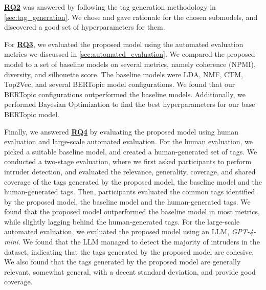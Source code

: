\hyperref[rq2]{\textbf{RQ2}} was answered by following the tag generation methodology in \cref{sec:tag_generation}. We chose and gave rationale for the chosen submodels, and discovered a good set of hyperparameters for them.

For \hyperref[rq3]{\textbf{RQ3}}, we evaluated the proposed model using the automated evaluation metrics we discussed in \cref{sec:automated_evaluation}. We compared the proposed model to a set of baseline models on several metrics, namely coherence (NPMI), diversity, and silhouette score. The baseline models were LDA, NMF, CTM, Top2Vec, and several BERTopic model configurations. We found that our BERTopic configurations outperformed the baseline models. Additionally, we performed Bayesian Optimization to find the best hyperparameters for our base BERTopic model.

Finally, we answered \hyperref[rq4]{\textbf{RQ4}} by evaluating the proposed model using human evaluation and large-scale automated evaluation. For the human evaluation,  we picked a suitable baseline model, and created a human-generated set of tags. We conducted a two-stage evaluation, where we first asked participants to perform intruder detection, and evaluated the relevance, generality, coverage, and shared coverage of the tags generated by the proposed model, the baseline model and the human-generated tags. Then, participants evaluated the common tags identified by the proposed model, the baseline model and the human-generated tags. We found that the proposed model outperformed the baseline model in most metrics, while slightly lagging behind the human-generated tags. For the large-scale automated evaluation, we evaluated the proposed model using an LLM, \textit{GPT-4-mini}. We found that the LLM managed to detect the majority of intruders in the dataset, indicating that the tags generated by the proposed model are cohesive. We also found that the tags generated by the proposed model are generally relevant, somewhat general, with a decent standard deviation, and provide good coverage.
